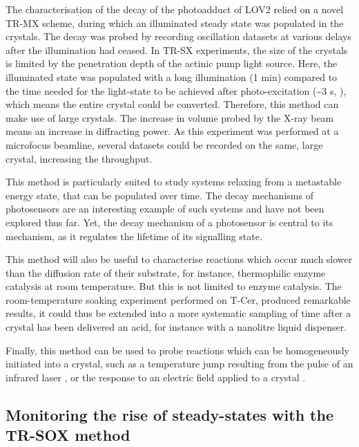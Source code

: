 The characterisation of the decay of the photoadduct of LOV2 relied on a novel TR-MX scheme, during which an illuminated steady state was populated in the crystals. The decay was probed by recording oscillation datasets at various delays after the illumination had ceased. In TR-SX experiments, the size of the crystals is limited by the penetration depth of the actinic pump light source. Here, the illuminated state was populated with a long illumination (1 min) compared to the time needed for the light-state to be achieved after photo-excitation (\textasciitilde 3 \textmu s, \cite{kasaharaPhotochemicalPropertiesFlavin2002}), which means the entire crystal could be converted. Therefore, this method can make use of large crystals. The increase in volume probed by the X-ray beam means an increase in diffracting power. As this experiment was performed at a microfocus beamline, several datasets could be recorded on the same, large crystal, increasing the throughput.

This method is particularly suited to study systems relaxing from a metastable energy state, that can be populated over time. The decay mechanisms of photosensors are an interesting example of such systems and have not been explored thus far. Yet, the decay mechanism of a photosensor is central to its mechanism, as it regulates the lifetime of its signalling state. 

This method will also be useful to characterise reactions which occur much slower than the diffusion rate of their substrate, for instance, thermophilic enzyme catalysis at room temperature. But this is not limited to enzyme catalysis. The room-temperature soaking experiment performed on T-Cer, produced remarkable results, it could thus be extended into a more systematic sampling of time after a crystal has been delivered an acid, for instance with a nanolitre liquid dispenser. 

Finally, this method can be used to probe reactions which can be homogeneously initiated into a crystal, such as a temperature jump resulting from the pulse of an infrared laser \parencite{wolffMappingProteinDynamics2023}, or the response to an electric field applied to a crystal \parencite{hekstraElectricfieldstimulatedProteinMechanics2016}. 

\subsection{Monitoring the rise of steady-states with the TR-SOX method}


